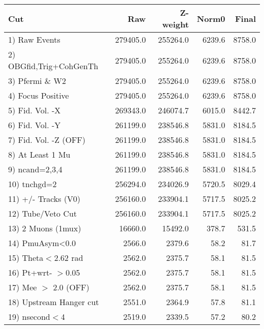  \begin{table}[h!]\centering
 \begin{tabular}{||l||r|r|r|r||}
 \hline
 \hline
 Cut & Raw & Z-weight & Norm0 & Final \\
 \hline
  1) Raw Events           &    279405.0 &    255264.0 &      6239.6 &      8758.0 \\
  2) OBGfid,Trig+CohGenTh &    279405.0 &    255264.0 &      6239.6 &      8758.0 \\
  3) Pfermi \& W2         &    279405.0 &    255264.0 &      6239.6 &      8758.0 \\
  4) Focus Positive       &    279405.0 &    255264.0 &      6239.6 &      8758.0 \\
  5) Fid. Vol. -X         &    269343.0 &    246074.7 &      6015.0 &      8442.7 \\
  6) Fid. Vol. -Y         &    261199.0 &    238546.8 &      5831.0 &      8184.5 \\
  7) Fid. Vol. -Z (OFF)   &    261199.0 &    238546.8 &      5831.0 &      8184.5 \\
  8) At Least 1 Mu        &    261199.0 &    238546.8 &      5831.0 &      8184.5 \\
  9) ncand=2,3,4          &    261199.0 &    238546.8 &      5831.0 &      8184.5 \\
 10) tnchgd=2             &    256294.0 &    234026.9 &      5720.5 &      8029.4 \\
 11) +/- Tracks (V0)      &    256160.0 &    233904.1 &      5717.5 &      8025.2 \\
 12) Tube/Veto Cut        &    256160.0 &    233904.1 &      5717.5 &      8025.2 \\
 13) 2 Muons (1mux)       &     16660.0 &     15492.0 &       378.7 &       531.5 \\
 14) PmuAsym<0.0          &      2566.0 &      2379.6 &        58.2 &        81.7 \\
 15) Theta$<$2.62 rad     &      2562.0 &      2375.7 &        58.1 &        81.5 \\
 16) Pt+wrt- $>$0.05      &      2562.0 &      2375.7 &        58.1 &        81.5 \\
 17) Mee $>$ 2.0  (OFF)   &      2562.0 &      2375.7 &        58.1 &        81.5 \\
 18) Upstream Hanger cut  &      2551.0 &      2364.9 &        57.8 &        81.1 \\
 19) nsecond$<$4          &      2519.0 &      2339.5 &        57.2 &        80.2 \\

\end{tabular}
\end{table}
